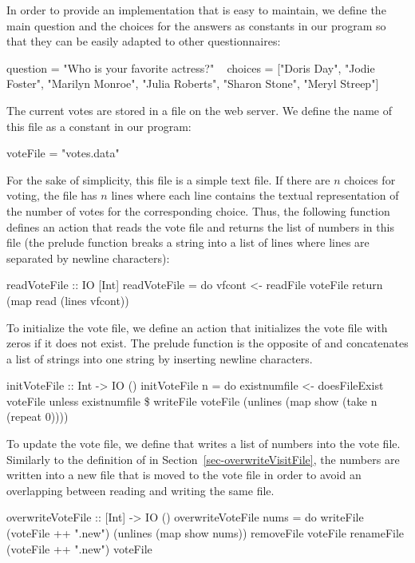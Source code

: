 In order to provide an implementation that is easy to maintain,
we define the main question and the choices for the answers
as constants in our program so that they can be easily adapted
to other questionnaires:
\begin{prog}
question = "Who is your favorite actress?"
~
choices = ["Doris Day", "Jodie Foster", "Marilyn Monroe",
           "Julia Roberts", "Sharon Stone", "Meryl Streep"]
\end{prog}
%
The current votes are stored in a file on the web server.
We define the name of this file as a constant in our program:
%
\begin{prog}
voteFile = "votes.data"
\end{prog}
%
For the sake of simplicity, this file is a simple text file.
If there are $n$ choices for voting, the file has $n$ lines
where each line contains the textual representation of the
number of votes for the corresponding choice.
Thus, the following function defines an action that reads
the vote file and returns the list of numbers in this file
(the prelude function  breaks
a string into a list of lines where lines are separated by newline
characters):
%
\begin{prog}
readVoteFile :: IO [Int]
readVoteFile = do
  vfcont <- readFile voteFile
  return (map read (lines vfcont))
\end{prog}
%
To initialize the vote file, we define an action 
that initializes the vote file with  zeros if it does not exist.
The prelude function 
is the opposite of  and concatenates a list of strings
into one string by inserting newline characters.
%
\begin{prog}
initVoteFile :: Int -> IO ()
initVoteFile n = do
  existnumfile <- doesFileExist voteFile
  unless existnumfile \$
    writeFile voteFile (unlines (map show (take n (repeat 0))))
\end{prog}
%
To update the vote file, we define 
that writes a list of
numbers into the vote file. Similarly to the definition of
 in Section~\ref{sec-overwriteVisitFile},
the numbers are written into a new file that is moved to the vote file
in order to avoid an overlapping between reading and writing the same file.
%
\begin{prog}
overwriteVoteFile :: [Int] -> IO ()
overwriteVoteFile nums = do
  writeFile (voteFile ++ ".new") (unlines (map show nums))
  removeFile voteFile
  renameFile (voteFile ++ ".new") voteFile
\end{prog}
